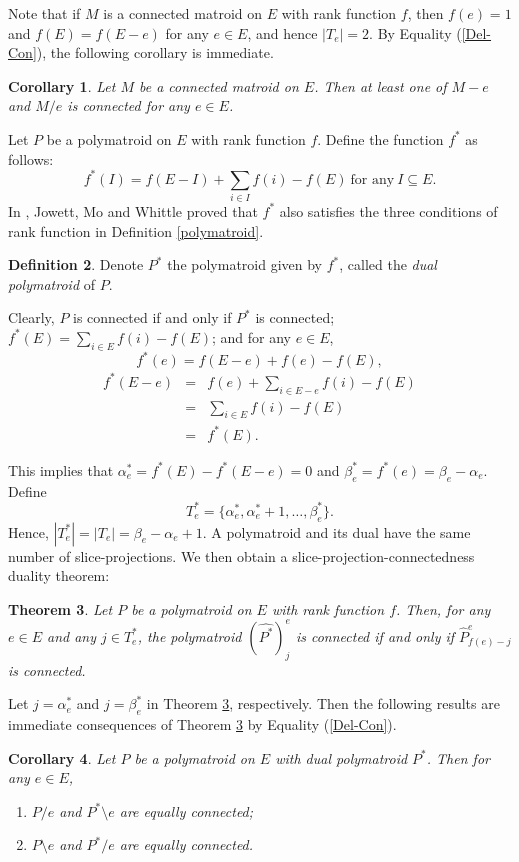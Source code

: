 \documentclass[preprint,10pt]{elsarticle}
\theoremstyle{plain}
\newtheorem{theorem}{Theorem}[section]
\newtheorem{corollary}[theorem]{Corollary}
\theoremstyle{definition}
\newtheorem{definition}[theorem]{Definition}
\theoremstyle{remark}
\begin{document}
Note that if $M$ is a connected matroid on $E$ with  rank function  $f$, then $f(e)=1$ and $f(E)=f(E-e)$  for any $e\in E$, and hence $|T_{e}|=2$. By Equality (\ref{Del-Con}), the following corollary is immediate.
\begin{corollary}\cite{Tutte}
Let $M$ be a connected matroid on $E$.  Then at least one of $M-e$ and $M/e$ is connected for any $e\in E$.
\end{corollary}

Let $P$ be a polymatroid on $E$ with rank function $f$. Define the function $f^*$ as follows:
\begin{equation}\label{dual-rank}
f^*(I) = f(E-I) + \sum_{i \in I} f(i) - f(E) ~\text{for any}~I\subseteq E.
\end{equation}
In \cite{Jowett}, Jowett, Mo and Whittle proved that $f^*$ also satisfies the three conditions of rank function in Definition \ref{polymatroid}.
\begin{definition}
Denote $P^*$ the polymatroid given by  $f^*$, called the \emph{dual polymatroid} of $P$.
\end{definition}
Clearly, $P$ is connected if and only if $P^*$ is connected;
$f^*(E) = \sum_{i \in E} f(i) - f(E)$;
and for any  $e\in E$,
\begin{equation*}
f^*(e) = f(E-e) + f(e) - f(E),
\end{equation*}
\begin{eqnarray*}
f^*(E-e)&=&f(e)+\sum_{i \in E-e} f(i) - f(E)\\
&=& \sum_{i \in E} f(i) - f(E) \\
 &=& f^*(E).
 \end{eqnarray*}

This implies that
$\alpha^*_{e}=f^*(E)-f^*(E-e)=0$ and $\beta^*_{e}=f^*(e)=\beta_{e}- \alpha_{e}$. Define
$$T^*_{e}=\{\alpha^*_{e}, \alpha^*_{e}+1,\ldots,\beta^*_{e}\}.$$
Hence, $|T^*_{e}|=|T_{e}|=\beta_{e}- \alpha_{e}+1$. A polymatroid and its dual have the same number of slice-projections. We then obtain a slice-projection-connectedness duality theorem:
\begin{theorem}\label{dual-connected}
Let $P$ be a polymatroid on $E$ with rank function $f$. Then, for any $e\in E$ and any $j\in T^*_{e}$, the polymatroid $(\widehat{P^{*}})_{j}^{e}$ is connected if and only if $\widehat{P}^{e}_{f(e)-j}$ is connected.
\end{theorem}

Let $j=\alpha^*_{e}$ and $j=\beta^*_{e}$ in Theorem \ref{dual-connected}, respectively. Then
the following results are immediate consequences of Theorem \ref{dual-connected} by Equality (\ref{Del-Con}).
 \begin{corollary}\label{dual-equal}
Let $P$ be a polymatroid on $E$ with dual polymatroid $P^*$.  Then for any $e\in E$,
\begin{enumerate}
\item [(i)] $P/e$ and $P^*\setminus e$ are equally connected;
\item [(ii)] $P\setminus e$ and $P^*/e$ are equally connected.
\end{enumerate}
\end{corollary}
\end{document}

